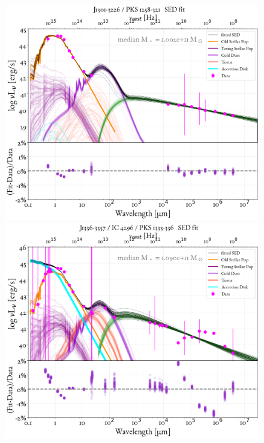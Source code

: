 \begin{figure}
    \centering
    \includegraphics[width=0.85\linewidth]{figures/ResultFits/52_SEDfit_4164.png}\\
    \includegraphics[width=0.85\linewidth]{figures/ResultFits/55_SEDfit_4287.png}   
\end{figure}
